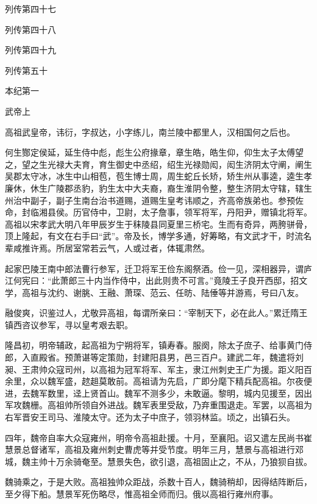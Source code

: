 \documentclass[12pt,UTF8]{ctexbook}
\begin{document}
列传第四十七

列传第四十八

列传第四十九

列传第五十











本纪第一

武帝上

高祖武皇帝，讳衍，字叔达，小字练儿，南兰陵中都里人，汉相国何之后也。

何生酂定侯延，延生侍中彪，彪生公府掾章，章生皓，皓生仰，仰生太子太傅望之，望之生光禄大夫育，育生御史中丞绍，绍生光禄勋闳，闳生济阴太守阐，阐生吴郡太守冰，冰生中山相苞，苞生博士周，周生蛇丘长矫，矫生州从事逵，逵生孝廉休，休生广陵郡丞豹，豹生太中大夫裔，裔生淮阴令整，整生济阴太守辖，辖生州治中副子，副子生南台治书道赐，道赐生皇考讳顺之，齐高帝族弟也。参预佐命，封临湘县侯。历官侍中，卫尉，太子詹事，领军将军，丹阳尹，赠镇北将军。高祖以宋孝武大明八年甲辰岁生于秣陵县同夏里三桥宅。生而有奇异，两胯骈骨，顶上隆起，有文在右手曰“武”。帝及长，博学多通，好筹略，有文武才干，时流名辈咸推许焉。所居室常若云气，人或过者，体辄肃然。

起家巴陵王南中郎法曹行参军，迁卫将军王俭东阁祭酒。俭一见，深相器异，谓庐江何宪曰：“此萧郎三十内当作侍中，出此则贵不可言。”竟陵王子良开西邸，招文学，高祖与沈约、谢朓、王融、萧琛、范云、任昉、陆倕等并游焉，号曰八友。

融俊爽，识鉴过人，尤敬异高祖，每谓所亲曰：“宰制天下，必在此人。”累迁隋王镇西咨议参军，寻以皇考艰去职。

隆昌初，明帝辅政，起高祖为宁朔将军，镇寿春。服阕，除太子庶子、给事黄门侍郎，入直殿省。预萧谌等定策勋，封建阳县男，邑三百户。建武二年，魏遣将刘昶、王肃帅众寇司州，以高祖为冠军将军、军主，隶江州刺史王广为援。距义阳百余里，众以魏军盛，趑趄莫敢前。高祖请为先启，广即分麾下精兵配高祖。尔夜便进，去魏军数里，迳上贤首山。魏军不测多少，未敢逼。黎明，城内见援至，因出军攻魏栅。高祖帅所领自外进战。魏军表里受敌，乃弃重围退走。军罢，以高祖为右军晋安王司马、淮陵太守。还为太子中庶子，领羽林监。顷之，出镇石头。

四年，魏帝自率大众寇雍州，明帝令高祖赴援。十月，至襄阳。诏又遣左民尚书崔慧景总督诸军，高祖及雍州刺史曹虎等并受节度。明年三月，慧景与高祖进行邓城，魏主帅十万余骑奄至。慧景失色，欲引退，高祖固止之，不从，乃狼狈自拔。

魏骑乘之，于是大败。高祖独帅众距战，杀数十百人，魏骑稍却，因得结阵断后，至夕得下船。慧景军死伤略尽，惟高祖全师而归。俄以高祖行雍州府事。
\end{document}
